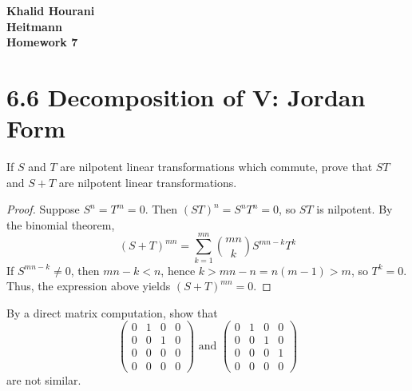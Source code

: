 \documentclass[12pt,leqno]{article}
\numberwithin{equation}{section}
\newcommand{\question}[2] {\vspace{.25in} \noindent\fbox{#1} #2 \vspace{.10in}}
\theoremstyle{definition}
\begin{document}
\thispagestyle{plain}
\begin{flushright}
\large{\textbf{Khalid Hourani\\
Heitmann\\
Homework 7\\
}}
\end{flushright}

\section*{6.6 Decomposition of V: Jordan Form}

\question{1}{If $S$ and $T$ are nilpotent linear transformations which commute, prove that $ST$ and $S+T$ are nilpotent linear transformations.}

\begin{proof}
 Suppose $S^n=T^m=0$. Then $(ST)^n=S^nT^n=0$, so $ST$ is nilpotent. By the binomial theorem, \[(S+T)^{mn}=\sum_{k=1}^{mn}{mn\choose k}S^{mn-k}T^k\] If $S^{mn-k}\not=0$, then $mn-k<n$, hence $k>mn-n=n(m-1)>m$, so $T^k=0$. Thus, the expression above yields $(S+T)^{mn}=0$.
\end{proof}

\question{2}{By a direct matrix computation, show that}\[\begin{pmatrix}0&1&0&0\\0&0&1&0\\0&0&0&0\\0&0&0&0\end{pmatrix}\text{ and }\begin{pmatrix}0&1&0&0\\0&0&1&0\\0&0&0&1\\0&0&0&0\end{pmatrix}\] are not similar.
\end{document}
